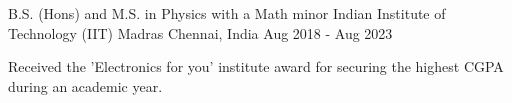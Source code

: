 

\begin{cventries}

  \cventry
    {B.S. (Hons) and M.S. in Physics with a Math minor } %
    {Indian Institute of Technology (IIT) Madras} %
    {Chennai, India} %
    {Aug 2018 - Aug 2023} %
    {
      \begin{cvitems} %
        \item {Received the 'Electronics for you' institute award for securing the highest CGPA during an academic year.}
      \end{cvitems}
    }

\end{cventries}
